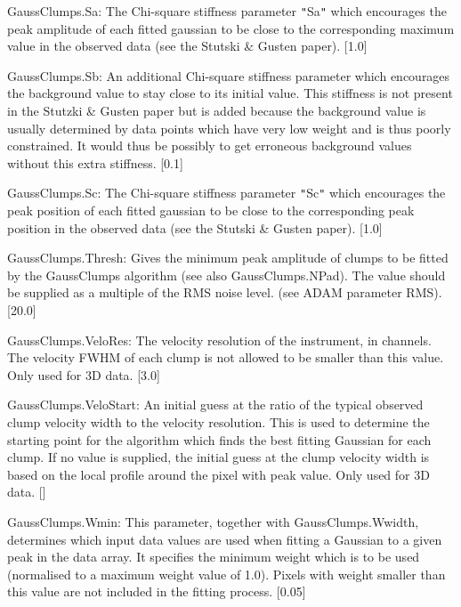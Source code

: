 \documentclass[twoside,11pt]{article}
\renewcommand{\_}{\texttt{\symbol{95}}}
\newcommand{\sstitem}{\item}
\newcommand{\sstitem}{\item}
\begin{document}
{{{         \sstitem
         GaussClumps.Sa: The Chi-square stiffness parameter {\tt "}Sa{\tt "} which
         encourages the peak amplitude of each fitted gaussian to be close to
         the corresponding maximum value in the observed data (see the Stutski
         \& Gusten paper). [1.0]

         \sstitem
         GaussClumps.Sb: An additional Chi-square stiffness parameter which
         encourages the background value to stay close to its initial value.
         This stiffness is not present in the Stutzki \& Gusten paper but is
         added because the background value is usually determined by data
         points which have very low weight and is thus poorly constrained. It
         would thus be possibly to get erroneous background values without
         this extra stiffness. [0.1]

         \sstitem
         GaussClumps.Sc: The Chi-square stiffness parameter {\tt "}Sc{\tt "} which
         encourages the peak position of each fitted gaussian to be close to
         the corresponding peak position in the observed data (see the Stutski
         \& Gusten paper). [1.0]

         \sstitem
         GaussClumps.Thresh: Gives the minimum peak amplitude of clumps to
         be fitted by the GaussClumps algorithm (see also GaussClumps.NPad).
         The value should be supplied as a multiple of the RMS noise level.
         (see ADAM parameter RMS). [20.0]

         \sstitem
         GaussClumps.VeloRes: The velocity resolution of the instrument, in
         channels. The velocity FWHM of each clump is not allowed to be
         smaller than this value. Only used for 3D data. [3.0]

         \sstitem
         GaussClumps.VeloStart: An initial guess at the ratio of the typical
         observed clump velocity width to the velocity resolution. This is used to
         determine the starting point for the algorithm which finds the best
         fitting Gaussian for each clump. If no value is supplied, the
         initial guess at the clump velocity width is based on the local profile
         around the pixel with peak value. Only used for 3D data. []

         \sstitem
         GaussClumps.Wmin: This parameter, together with GaussClumps.Wwidth,
         determines which input data values are used when fitting a Gaussian to
         a given peak in the data array. It specifies the minimum weight
         which is to be used (normalised to a maximum weight value of 1.0).
         Pixels with weight smaller than this value are not included in the
         fitting process. [0.05]

}}}
\end{document}
